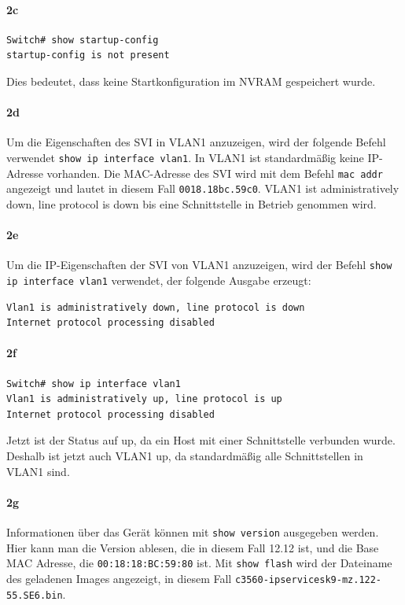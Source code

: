 \documentclass[a4paper]{article}
\newcommand{\abc}{\hfill \break}
\begin{document}
\paragraph{2c} \abc
\begin{lstlisting}
Switch# show startup-config
startup-config is not present
\end{lstlisting}
Dies bedeutet, dass keine Startkonfiguration im NVRAM gespeichert wurde.
\paragraph{2d} \abc
Um die Eigenschaften des SVI in VLAN1 anzuzeigen, wird der folgende Befehl verwendet \texttt{show ip interface vlan1}. \abc
In VLAN1 ist standardmäßig keine IP-Adresse vorhanden. \abc
Die MAC-Adresse des SVI wird mit dem Befehl \texttt{mac addr} angezeigt und lautet in diesem Fall \texttt{0018.18bc.59c0}. \abc
VLAN1 ist administratively down, line protocol is down bis eine Schnittstelle in Betrieb genommen wird. \abc
\paragraph{2e} \abc
Um die IP-Eigenschaften der SVI von VLAN1 anzuzeigen, wird der Befehl \texttt{show ip interface vlan1} verwendet, der folgende Ausgabe erzeugt: 
\begin{lstlisting}
Vlan1 is administratively down, line protocol is down
Internet protocol processing disabled	
\end{lstlisting}
\paragraph{2f} \abc
\begin{lstlisting}
Switch# show ip interface vlan1
Vlan1 is administratively up, line protocol is up
Internet protocol processing disabled	
\end{lstlisting}
Jetzt ist der Status auf up, da ein Host mit einer Schnittstelle verbunden wurde. Deshalb ist jetzt auch VLAN1 up, da standardmäßig alle Schnittstellen in VLAN1 sind.
\paragraph{2g} \abc
Informationen über das Gerät können mit \texttt{show version} ausgegeben werden. \abc
Hier kann man die Version ablesen, die in diesem Fall 12.12 ist, und die Base MAC Adresse, die \texttt{00:18:18:BC:59:80} ist. \abc
Mit \texttt{show flash} wird der Dateiname des geladenen Images angezeigt, in diesem Fall \texttt{c3560-ipservicesk9-mz.122-55.SE6.bin}. \abc
\end{document}
